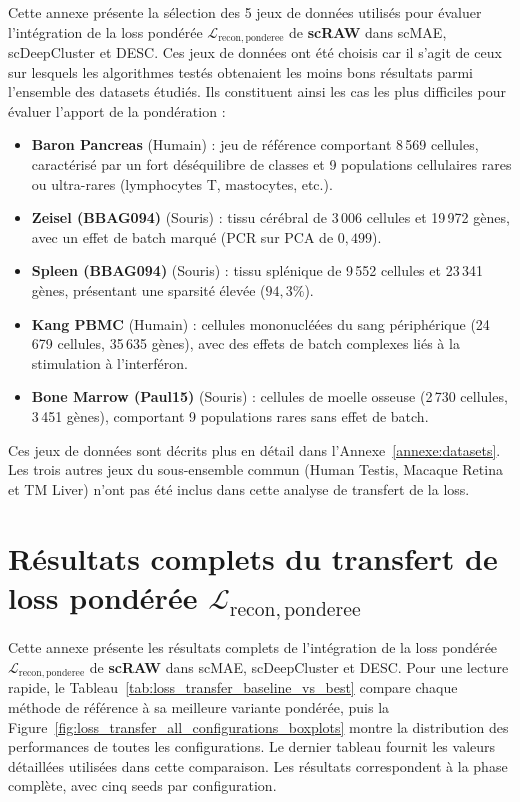 Cette annexe présente la sélection des 5 jeux de données utilisés pour évaluer l'intégration de la loss pondérée $\mathcal{L}_{\mathrm{recon,ponderee}}$ de \textbf{scRAW} dans scMAE, scDeepCluster et DESC. Ces jeux de données ont été choisis car il s'agit de ceux sur lesquels les algorithmes testés obtenaient les moins bons résultats parmi l'ensemble des datasets étudiés. Ils constituent ainsi les cas les plus difficiles pour évaluer l'apport de la pondération :
\begin{itemize}
    \item \textbf{Baron Pancreas} (Humain) : jeu de référence comportant 8\,569 cellules, caractérisé par un fort déséquilibre de classes et 9 populations cellulaires rares ou ultra-rares (lymphocytes T, mastocytes, etc.).
    \item \textbf{Zeisel (BBAG094)} (Souris) : tissu cérébral de 3\,006 cellules et 19\,972 gènes, avec un effet de batch marqué (PCR sur PCA de $0{,}499$).
    \item \textbf{Spleen (BBAG094)} (Souris) : tissu splénique de 9\,552 cellules et 23\,341 gènes, présentant une sparsité élevée ($94{,}3\%$).
    \item \textbf{Kang PBMC} (Humain) : cellules mononucléées du sang périphérique (24\,679 cellules, 35\,635 gènes), avec des effets de batch complexes liés à la stimulation à l'interféron.
    \item \textbf{Bone Marrow (Paul15)} (Souris) : cellules de moelle osseuse (2\,730 cellules, 3\,451 gènes), comportant 9 populations rares sans effet de batch.
\end{itemize}
Ces jeux de données sont décrits plus en détail dans l'Annexe~\ref{annexe:datasets}. Les trois autres jeux du sous-ensemble commun (Human Testis, Macaque Retina et TM Liver) n'ont pas été inclus dans cette analyse de transfert de la loss.

\newpage
\section{\texorpdfstring{Résultats complets du transfert de loss pondérée \(\mathcal{L}_{\mathrm{recon,ponderee}}\)}{Résultats complets du transfert de loss pondérée L recon ponderee}}
\label{annexe:loss_transfer_details}

Cette annexe présente les résultats complets de l'intégration de la loss pondérée \(\mathcal{L}_{\mathrm{recon,ponderee}}\) de \textbf{scRAW} dans scMAE, scDeepCluster et DESC. Pour une lecture rapide, le Tableau~\ref{tab:loss_transfer_baseline_vs_best} compare chaque méthode de référence à sa meilleure variante pondérée, puis la Figure~\ref{fig:loss_transfer_all_configurations_boxplots} montre la distribution des performances de toutes les configurations. Le dernier tableau fournit les valeurs détaillées utilisées dans cette comparaison. Les résultats correspondent à la phase complète, avec cinq seeds par configuration.

